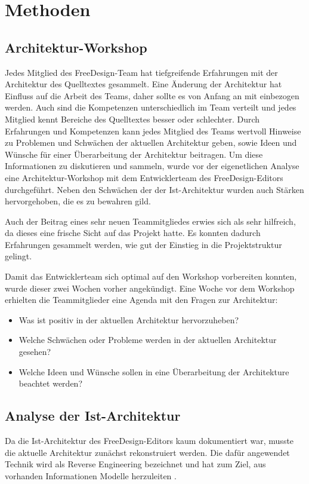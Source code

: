 \chapter{Methoden}

\section{Architektur-Workshop}
Jedes Mitglied des FreeDesign-Team hat tiefgreifende Erfahrungen mit der Architektur des Quelltextes gesammelt. %
Eine Änderung der Architektur hat Einfluss auf die Arbeit des Teams, daher sollte es von Anfang an mit einbezogen werden. 
Auch sind die Kompetenzen unterschiedlich im Team verteilt und jedes Mitglied kennt Bereiche des Quelltextes besser oder schlechter. 
Durch Erfahrungen und Kompetenzen kann jedes Mitglied des Teams wertvoll Hinweise zu Problemen und Schwächen der aktuellen Architektur geben, sowie Ideen und Wünsche für einer Überarbeitung der Architektur beitragen.
Um diese Informationen zu diskutieren und sammeln, wurde vor der eigenetlichen Analyse eine Architektur-Workshop mit dem Entwicklerteam des FreeDesign-Editors durchgeführt. Neben den Schwächen der der Ist-Architektur wurden auch Stärken hervorgehoben, die es zu bewahren gild. 

Auch der Beitrag eines sehr neuen Teammitgliedes erwies sich als sehr hilfreich, da dieses eine frische Sicht auf das Projekt hatte. Es konnten dadurch Erfahrungen gesammelt werden, wie gut der Einstieg in die Projektstruktur gelingt. 

Damit das Entwicklerteam sich optimal auf den Workshop vorbereiten konnten, wurde dieser zwei Wochen vorher angekündigt. Eine Woche vor dem Workshop erhielten die Teammitglieder eine Agenda mit den Fragen zur Architektur:
\begin{itemize}
	\item Was ist positiv in der aktuellen Architektur hervorzuheben?
	\item Welche Schwächen oder Probleme werden in der aktuellen Architektur gesehen?
	\item Welche Ideen und Wünsche sollen in eine Überarbeitung der Architekture beachtet werden?
\end{itemize}


\section{Analyse der Ist-Architektur}
Da die Ist-Architektur des FreeDesign-Editors kaum dokumentiert war, musste die aktuelle Architektur zunächst rekonstruiert werden. 
Die dafür angewendet Technik wird als Reverse Engineering bezeichnet und hat zum Ziel, aus vorhanden Informationen Modelle herzuleiten \autocite[vgl.][590]{LudewigLichter2013}. 

